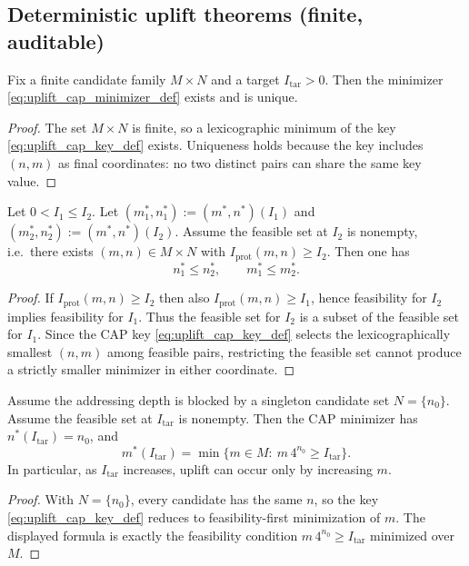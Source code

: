 \subsection{Deterministic uplift theorems (finite, auditable)}
\label{subsec:uplift_theorems}

\begin{lemma}\label{lem:uplift_cap_unique}
Fix a finite candidate family $M\times N$ and a target $I_{\mathrm{tar}}>0$.
Then the minimizer \eqref{eq:uplift_cap_minimizer_def} exists and is unique.
\end{lemma}
\begin{proof}
The set $M\times N$ is finite, so a lexicographic minimum of the key \eqref{eq:uplift_cap_key_def} exists.
Uniqueness holds because the key includes $(n,m)$ as final coordinates: no two distinct pairs can share the same key value.
\end{proof}

\begin{lemma}\label{lem:uplift_monotone_in_Itar}
Let $0<I_1\le I_2$.
Let $(m_1^\ast,n_1^\ast):=(m^\ast,n^\ast)(I_1)$ and $(m_2^\ast,n_2^\ast):=(m^\ast,n^\ast)(I_2)$.
Assume the feasible set at $I_2$ is nonempty, i.e.\ there exists $(m,n)\in M\times N$ with $I_{\mathrm{prot}}(m,n)\ge I_2$.
Then one has
\[
n_1^\ast\le n_2^\ast,
\qquad
m_1^\ast\le m_2^\ast.
\]
\end{lemma}
\begin{proof}
If $I_{\mathrm{prot}}(m,n)\ge I_2$ then also $I_{\mathrm{prot}}(m,n)\ge I_1$, hence feasibility for $I_2$ implies feasibility for $I_1$.
Thus the feasible set for $I_2$ is a subset of the feasible set for $I_1$.
Since the CAP key \eqref{eq:uplift_cap_key_def} selects the lexicographically smallest $(n,m)$ among feasible pairs, restricting the feasible set cannot produce a strictly smaller minimizer in either coordinate.
\end{proof}

\begin{proposition}\label{prop:n_blocked_implies_m_expand}
Assume the addressing depth is blocked by a singleton candidate set $N=\{n_0\}$.
Assume the feasible set at $I_{\mathrm{tar}}$ is nonempty.
Then the CAP minimizer has $n^\ast(I_{\mathrm{tar}})=n_0$, and
\[
m^\ast(I_{\mathrm{tar}})=\min\{m\in M:\ m\,4^{n_0}\ge I_{\mathrm{tar}}\}.
\]
In particular, as $I_{\mathrm{tar}}$ increases, uplift can occur only by increasing $m$.
\end{proposition}
\begin{proof}
With $N=\{n_0\}$, every candidate has the same $n$, so the key \eqref{eq:uplift_cap_key_def} reduces to feasibility-first minimization of $m$.
The displayed formula is exactly the feasibility condition $m\,4^{n_0}\ge I_{\mathrm{tar}}$ minimized over $M$.
\end{proof}

